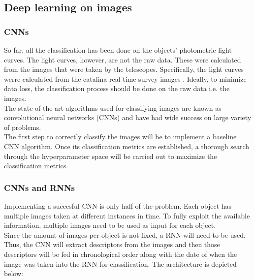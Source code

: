 \subsection{Deep learning on images}

\subsubsection{CNNs}

So far, all the classification has been done on the objects' photometric light curves. The light curves, however, are not the raw data. These were calculated from the images that were taken by the telescopes. Specifically, the light curves werre calculated from the catalina real time survey images \cite{catalinaImages}. Ideally, to minimize data loss, the classification process should be done on the raw data i.e. the images.\\ 

The state of the art algorithms used for classifying images are known as convolutional neural networks (CNNs) \cite{CNN} and have had wide success on large variety of problems.\\

The first step to correctly classify the images will be to implement a baseline CNN algorithm. Once its classification  metrics are established, a thorough search through the hyperparameter space will be carried out to maximize the classification metrics.

\subsubsection{CNNs and RNNs}

Implementing a succesful CNN is only half of the problem. Each object has multiple images taken at different instances in time. To fully exploit the available information, multiple images need to be used as input for each object.\\

Since the amount of images per object is not fixed, a RNN will need to be used. Thus, the CNN will extract descriptors from the images and then those descriptors will be fed in chronological order along with the date of when the image was taken into the RNN for classification. The architecture is depicted below:

